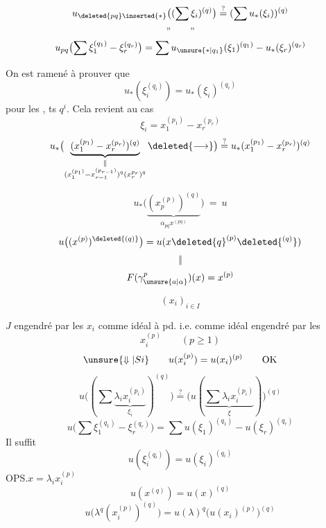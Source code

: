 
\[
u_{\deleted{pq}\inserted{*}}\bigl((\sum\xi_i)^{(q)}\bigr)
\overset{?}{=}(\sum u_*(\xi_i))^{(q)}
\]
\[\text{''}\qquad\text{''}\]
\[
u_{pq}\bigl(\sum\xi_1^{(q_1)}-\xi_r^{(q_r)}\bigr)
=\sum u_{\unsure{*|q_1}}(\xi_1)^{(q_1)}-u_*(\xi_r)^{(q_r)}
\]

On est ramené à prouver que
\[
u_*(\xi_i^{(q_i)})=u_*(\xi_i)^{(q_i)}
\]
pour les , ts $q^i$.
Cela revient au cas
\[
\xi_i=x_1^{(p_1)}-x_r^{(p_r)}
\]
\[
u_*\bigl(\underbrace{(x_1^{(p_1)}-x_r^{(p_r)})^{(q)}}_{\substack{\Vert\\(x_1^{(p_1)}-x_{r-1}^{(p_{r-1})})^q(x_r^{p_r})^q}}\deleted{\longrightarrow}\bigr)
\overset{?}{=}u_*(x_1^{(p_1)}-x_r^{(p_r)})^{(q)}
\]

\[
u_*\bigl(\underbrace{(x_{p}^{(p)})^{(q)}}_{\alpha_{pq}x^{(pq)}}\bigr)\ =\ u
\]
\[
u\bigl((x^{(p)})^{\deleted{(q)}}\bigr)
=u(x\deleted{q}^{(p)}\deleted{^{(q)}})
\]
\[\Vert\]
\[
F(\gamma_{\unsure{a|\alpha}}^p)(x)=x^{(p)}
\]

\[(x_i)_{i\in I}\]

$J$ engendré par les $x_i$ comme idéal à pd.
i.e. comme idéal engendré par les
\[
x_i^{(p)}\qquad(p\geq1)
\]
\[
\unsure{\Downarrow|Si}\qquad u(x_i^{(p)})=u(x_i)^{(p)}\qquad\mathrm{OK}
\]
\[
u\bigl((\sum\underbrace{\lambda_i x_i^{(p_i)}}_{\xi_i})^{(q)}\bigr)
\overset{?}{=}\bigl(u(\underbrace{\sum\lambda_i x_i^{(p_i)}}_{\xi})\bigr)^{(q)}
\]
\[
u\bigl(\sum\xi_1^{(q_1)}-\xi_r^{(q_r)}\bigr)
=\sum u(\xi_1)^{(q_1)}-u(\xi_r)^{(q_r)}
\]
Il suffit
\[
u(\xi_i^{(q_i)})=u(\xi_i)^{(q_i)}
\]
OPS.\quad $x=\lambda_i x_i^{(p)}$
\[
u(x^{(q)})=u(x)^{(q)}
\]
\[
u\bigl(\lambda^q(x_i^{(p)})^{(q)}\bigr)
=u(\lambda)^q\bigl(u(x_i)^{(p)}\bigr)^{(q)}
\]

